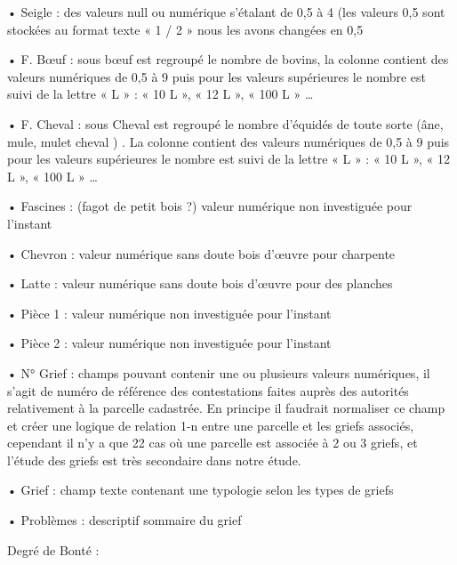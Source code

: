 •	Seigle : des valeurs null ou numérique s’étalant de 0,5 à 4 (les valeurs 0,5 sont stockées au format texte « 1 / 2 » nous les avons changées en 0,5

•	F. Bœuf : sous bœuf est regroupé le nombre de bovins, la colonne contient des valeurs numériques de 0,5 à 9 puis pour les valeurs supérieures le nombre est suivi de la lettre « L » : « 10 L », « 12 L », « 100 L » …

•	F. Cheval : sous Cheval est regroupé le nombre d’équidés de toute sorte (âne, mule, mulet cheval ) . La colonne contient des valeurs numériques de 0,5 à 9 puis pour les valeurs supérieures le nombre est suivi de la lettre « L » : « 10 L », « 12 L », « 100 L » …

•	Fascines : (fagot de petit bois ?) valeur numérique non investiguée pour l’instant

•	Chevron : valeur numérique sans doute bois d'œuvre pour charpente

•	Latte : valeur numérique sans doute bois d'œuvre pour des planches

•	Pièce 1 : valeur numérique non investiguée pour l’instant

•	Pièce 2 : valeur numérique non investiguée pour l’instant

•	N° Grief : champs pouvant contenir une ou plusieurs valeurs numériques, il s’agit de numéro de référence des contestations faites auprès des autorités relativement à la parcelle cadastrée. En principe il faudrait normaliser ce champ et créer une logique de relation 1-n entre une parcelle et les griefs associés, cependant il n’y a que 22 cas où une parcelle est associée à 2 ou 3 griefs, et l’étude des griefs est très secondaire dans notre étude.

•	Grief : champ texte contenant une typologie selon les types de griefs

•	Problèmes : descriptif sommaire du grief


Degré de Bonté :

